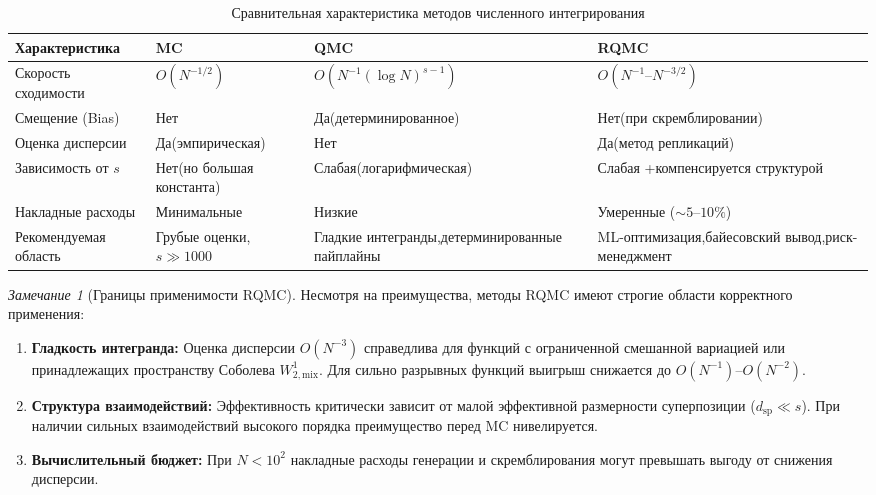 \documentclass[12pt, a4paper]{article}
\theoremstyle{plain}
\theoremstyle{definition}
\theoremstyle{remark}
\newtheorem{remark}[theorem]{Замечание}
\begin{document}
\begin{table}[h!]
\centering
\caption{Сравнительная характеристика методов численного интегрирования}
\label{tab:mc_qmc_rqmc_comparison}
\vspace{2mm}
\begin{tabular}{@{}p{3.5cm}p{3.5cm}p{4.0cm}p{5.0cm}@{}}
\toprule
\textbf{Характеристика} & \textbf{MC} & \textbf{QMC} & \textbf{RQMC} \\ \midrule
Скорость сходимости & $O(N^{-1/2})$ & $O(N^{-1}(\log N)^{s-1})$ & $O(N^{-1} \text{--} N^{-3/2})$ \\ \addlinespace
Смещение (Bias) & Нет & Да\newline (детерминированное) & Нет\newline (при скремблировании) \\ \addlinespace
Оценка дисперсии & Да\newline (эмпирическая) & Нет & Да\newline (метод репликаций) \\ \addlinespace
Зависимость от $s$ & Нет\newline (но большая константа) & Слабая\newline (логарифмическая) & Слабая +\newline компенсируется структурой \\ \addlinespace
Накладные расходы & Минимальные & Низкие & Умеренные ($\sim 5$--$10\%$) \\ \addlinespace
Рекомендуемая область & Грубые оценки,\newline $s \gg 1000$ & Гладкие интегранды,\newline детерминированные пайплайны & ML-оптимизация,\newline байесовский вывод,\newline риск-менеджмент \\ \bottomrule
\end{tabular}
\end{table}

\begin{remark}[Границы применимости RQMC]
Несмотря на преимущества, методы RQMC имеют строгие области корректного применения:
\begin{enumerate}
    \item \textbf{Гладкость интегранда:} Оценка дисперсии $O(N^{-3})$ справедлива для функций с ограниченной смешанной вариацией или принадлежащих пространству Соболева $W_{2,\mathrm{mix}}^1$. Для сильно разрывных функций выигрыш снижается до $O(N^{-1})$--$O(N^{-2})$.
    \item \textbf{Структура взаимодействий:} Эффективность критически зависит от малой эффективной размерности суперпозиции ($d_{\mathrm{sp}} \ll s$). При наличии сильных взаимодействий высокого порядка преимущество перед MC нивелируется.
    \item \textbf{Вычислительный бюджет:} При $N < 10^2$ накладные расходы генерации и скремблирования могут превышать выгоду от снижения дисперсии.
\end{enumerate}
\end{remark}
\end{document}
